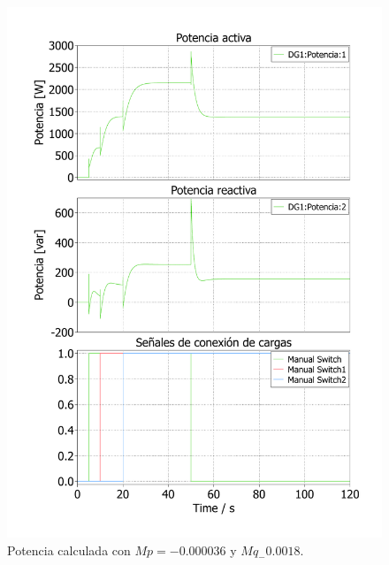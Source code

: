 \begin{figure}
   \centering
   \includegraphics[width=0.5\linewidth]{Tarea 1/report/imagenes/p3a/droop_3.pdf}
   \caption{Potencia calculada con $Mp = -0.000036$ y $Mq_-0.0018$.}
   \label{droop_3}
\end{figure}
